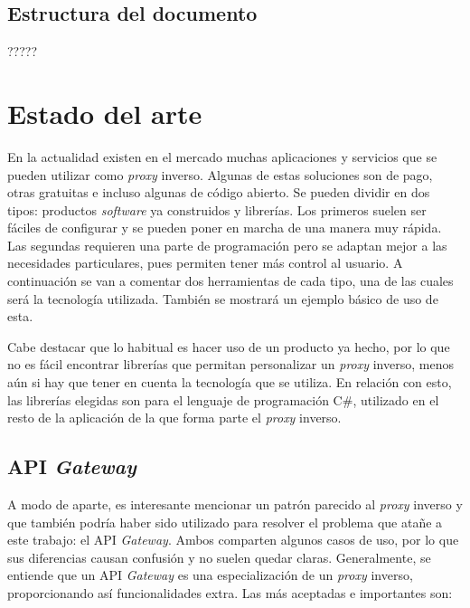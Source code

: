 \documentclass[11pt,spanish,listoffigures]{tfgetsinf}
\begin{document}

\section{Estructura del documento}

?????


\chapter{Estado del arte}

En la actualidad existen en el mercado muchas aplicaciones y servicios que se pueden utilizar como \emph{proxy} inverso. Algunas de estas soluciones son de pago, otras gratuitas e incluso algunas de código abierto. Se pueden dividir en dos tipos: productos \emph{software} ya construidos y librerías. Los primeros suelen ser fáciles de configurar y se pueden poner en marcha de una manera muy rápida. Las segundas requieren una parte de programación pero se adaptan mejor a las necesidades particulares, pues permiten tener más control al usuario. A continuación se van a comentar dos herramientas de cada tipo, una de las cuales será la tecnología utilizada. También se mostrará un ejemplo básico de uso de esta.

Cabe destacar que lo habitual es hacer uso de un producto ya hecho, por lo que no es fácil encontrar librerías que permitan personalizar un \emph{proxy} inverso, menos aún si hay que tener en cuenta la tecnología que se utiliza. En relación con esto, las librerías elegidas son para el lenguaje de programación C\#, utilizado en el resto de la aplicación de la que forma parte el \emph{proxy} inverso.


\section{API \emph{Gateway}}

A modo de aparte, es interesante mencionar un patrón parecido al \emph{proxy} inverso y que también podría haber sido utilizado para resolver el problema que atañe a este trabajo: el API \emph{Gateway}. Ambos comparten algunos casos de uso, por lo que sus diferencias causan confusión y no suelen quedar claras. Generalmente, se entiende que un API \emph{Gateway} es una especialización de un \emph{proxy} inverso, proporcionando así funcionalidades extra. Las más aceptadas e importantes son:
\end{document}
